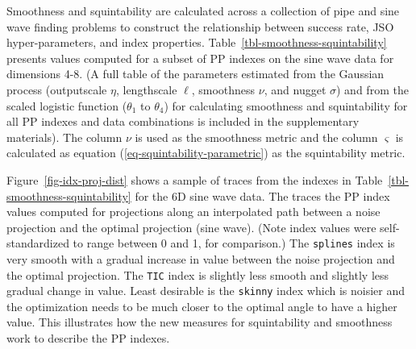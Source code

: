 \documentclass[
  12pt,
]{interact}
\theoremstyle{plain}
\begin{document}
Smoothness and squintability are calculated across a collection of pipe
and sine wave finding problems to construct the relationship between
success rate, JSO hyper-parameters, and index properties.
Table~\ref{tbl-smoothness-squintability} presents values computed for a
subset of PP indexes on the sine wave data for dimensions 4-8. (A full
table of the parameters estimated from the Gaussian process (outputscale
\(\eta\), lengthscale \(\ell\), smoothness \(\nu\), and nugget
\(\sigma\)) and from the scaled logistic function (\(\theta_1\) to
\(\theta_4\)) for calculating smoothness and squintability for all PP
indexes and data combinations is included in the supplementary
materials). The column \(\nu\) is used as the smoothness metric and the
column \(\varsigma\) is calculated as equation
(\ref{eq-squintability-parametric}) as the squintability metric.

Figure~\ref{fig-idx-proj-dist} shows a sample of traces from the indexes
in Table~\ref{tbl-smoothness-squintability} for the 6D sine wave data.
The traces the PP index values computed for projections along an
interpolated path between a noise projection and the optimal projection
(sine wave). (Note index values were self-standardized to range between
0 and 1, for comparison.) The \texttt{splines} index is very smooth with
a gradual increase in value between the noise projection and the optimal
projection. The \texttt{TIC} index is slightly less smooth and slightly
less gradual change in value. Least desirable is the \texttt{skinny}
index which is noisier and the optimization needs to be much closer to
the optimal angle to have a higher value. This illustrates how the new
measures for squintability and smoothness work to describe the PP
indexes.

\begin{table}

\caption{\label{tbl-smoothness-squintability}The columns \(\nu\) and
\(\varsigma\) show the smoothness and squintability measures for three
PP indexes for the sine wave data. The splines index has the largest
squint angle and is the smoothest. The skinny index has low smoothness
and smallest squint angle. As dimension increases the squint angle gets
smaller but smoothness doesn't change much.}


\end{table}%
\end{document}
